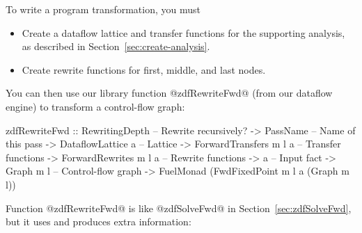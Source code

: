 \documentclass[blockstyle,preprint,natbib,nocopyrightspace]{sigplanconf}
\newcommand\secref[1]{Section~\ref{sec:#1}}
\newcommand\seclabel[1]{\label{sec:#1}}
\begin{document}
To write a program transformation,
you must 
\begin{itemize}
\item
Create a dataflow lattice and transfer functions for the supporting
analysis, as described in \secref{create-analysis}. 
\item
Create rewrite functions for first, middle, and last nodes.
\end{itemize}
You can then use our
library function @zdfRewriteFwd@ (from our dataflow engine) to
transform a control-flow 
graph:
\begin{code}
 zdfRewriteFwd 
  :: RewritingDepth         -- Rewrite recursively?
  -> PassName               -- Name of this pass
  -> DataflowLattice a      -- Lattice
  -> ForwardTransfers m l a -- Transfer functions
  -> ForwardRewrites  m l a -- Rewrite functions
  -> a                      -- Input fact
  -> Graph m l              -- Control-flow graph
  -> FuelMonad (FwdFixedPoint m l a (Graph m l))
\end{code}
Function @zdfRewriteFwd@ is like @zdfSolveFwd@ in
\secref{zdfSolveFwd}, but it uses and produces extra
information:\seclabel{engine-truth} 
\end{document}
